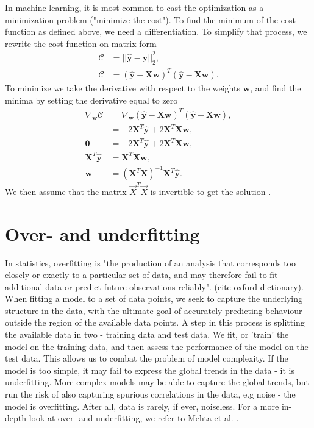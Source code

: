 In machine learning, it is most common to cast the optimization as a minimization problem
("minimize the cost"). To find the minimum of the cost function as defined above, we need
a differentiation. To simplify that process, we rewrite the cost function on matrix form
\begin{align*}
\mathcal{C} &= || \boldsymbol{\hat{y}} - \boldsymbol{y} ||_2 ^2, \\
\mathcal{C} &= ( \boldsymbol{\hat{y}} - \boldsymbol{Xw})^T( \boldsymbol{\hat{y}} - \boldsymbol{Xw}).
\end{align*}
To minimize we take the derivative with respect to the weights $\boldsymbol{w}$,
and find the minima by setting the derivative equal to zero
\begin{align}
\nabla _{\boldsymbol{w}}\mathcal{C} &= \nabla _{\boldsymbol{w}} ( \boldsymbol{\hat{y}} - \boldsymbol{Xw})^T( \boldsymbol{\hat{y}} - \boldsymbol{Xw}), \\
&= -2\boldsymbol{X}^T\boldsymbol{\hat{y}} + 2\boldsymbol{X}^T\boldsymbol{X}\boldsymbol{w}, \\
\boldsymbol{0} &= -2\boldsymbol{X}^T\boldsymbol{\hat{y}} + 2\boldsymbol{X}^T\boldsymbol{X}\boldsymbol{w}, \\
\boldsymbol{X}^T\boldsymbol{\hat{y}} &= \boldsymbol{X}^T\boldsymbol{X}\boldsymbol{w}, \\
\boldsymbol{w} &=(\boldsymbol{X}^T\boldsymbol{X})^{-1} \boldsymbol{X}^T\boldsymbol{\hat{y}}. \label{eq:ols}
\end{align}
We then assume that the matrix \(\vec{X}^T\vec{X}\)
is invertible to get the solution \cite{James2000}.

\section{Over- and underfitting}\label{sec:overfitting}
In statistics, overfitting is "the production of an analysis that corresponds too closely or exactly to a 
particular set of data, and may therefore fail to fit additional data or predict future observations reliably".
(cite oxford dictionary).
When fitting a model to a set of data points, we seek to capture the underlying structure in the data,
with the ultimate goal of accurately predicting behaviour outside the region of the available data points.
A step in this process is splitting the available data in two - training data and test data. We fit, or 'train'
the model on the training data, and then assess the performance of the model on the test data. This allows us
to combat the problem of model complexity. If the model is too simple, it may fail to express the global trends 
in the data - it is underfitting. More complex models may be able to capture the global trends, but run the risk of 
also capturing spurious correlations in the data, e.g noise - the model is overfitting. After all, data is rarely,
if ever, noiseless. For a more in-depth look at over- and underfitting, we refer to Mehta et al. \cite{Mehta2019}.


